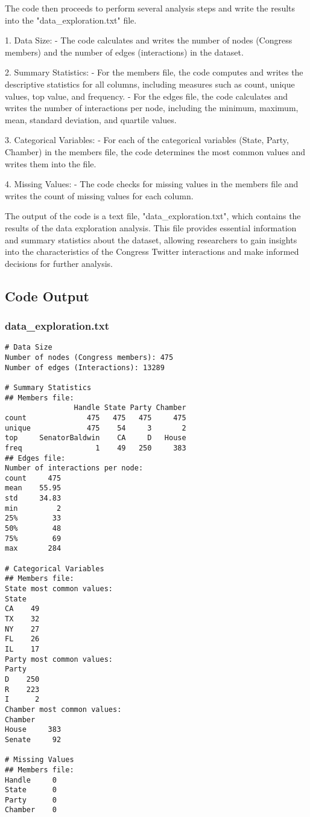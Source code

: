 \documentclass[11pt]{article}
\begin{document}
The code then proceeds to perform several analysis steps and write the results into the "data\_exploration.txt" file.

1. Data Size:
   - The code calculates and writes the number of nodes (Congress members) and the number of edges (interactions) in the dataset.

2. Summary Statistics:
   - For the members file, the code computes and writes the descriptive statistics for all columns, including measures such as count, unique values, top value, and frequency.
   - For the edges file, the code calculates and writes the number of interactions per node, including the minimum, maximum, mean, standard deviation, and quartile values.

3. Categorical Variables:
   - For each of the categorical variables (State, Party, Chamber) in the members file, the code determines the most common values and writes them into the file.

4. Missing Values:
   - The code checks for missing values in the members file and writes the count of missing values for each column.

The output of the code is a text file, "data\_exploration.txt", which contains the results of the data exploration analysis. This file provides essential information and summary statistics about the dataset, allowing researchers to gain insights into the characteristics of the Congress Twitter interactions and make informed decisions for further analysis.

\subsection{Code Output}

\subsubsection*{data\_exploration.txt}

\begin{Verbatim}[tabsize=4]
# Data Size
Number of nodes (Congress members): 475
Number of edges (Interactions): 13289

# Summary Statistics
## Members file:
                Handle State Party Chamber
count              475   475   475     475
unique             475    54     3       2
top     SenatorBaldwin    CA     D   House
freq                 1    49   250     383
## Edges file:
Number of interactions per node:
count     475
mean    55.95
std     34.83
min         2
25%        33
50%        48
75%        69
max       284

# Categorical Variables
## Members file:
State most common values:
State
CA    49
TX    32
NY    27
FL    26
IL    17
Party most common values:
Party
D    250
R    223
I      2
Chamber most common values:
Chamber
House     383
Senate     92

# Missing Values
## Members file:
Handle     0
State      0
Party      0
Chamber    0


\end{Verbatim}
\end{document}
